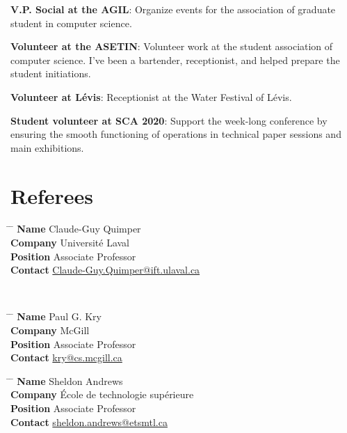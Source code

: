 \documentclass[10pt]{article} %
\begin{document}
\textbf{V.P. Social at the AGIL}: Organize events for the association of graduate student in computer science.

\textbf{Volunteer at the ASETIN}: Volunteer work at the student association of computer science. I've been a bartender, receptionist, and helped prepare the student initiations.

\textbf{Volunteer at Lévis}: Receptionist at the Water Festival of Lévis.

\textbf{Student volunteer at SCA 2020}: Support the week-­long conference by ensuring the smooth functioning of operations in technical paper sessions and main exhibitions.

\section{Referees}

\parbox{0.5\textwidth}{ 
\begin{tabbing}
\hspace{2.75cm} \= \hspace{4cm} \= \kill 
{\bf Name} \> Claude-Guy Quimper \\ 
{\bf Company} \> Université Laval \\ 
{\bf Position} \> Associate Professor \\  
{\bf Contact} \> \href{mailto:Claude-Guy.Quimper@ift.ulaval.ca}{Claude-Guy.Quimper@ift.ulaval.ca} 
\end{tabbing}}\\

\parbox{0.5\textwidth}{
\begin{tabbing}
\hspace{2.75cm} \= \hspace{4cm} \= \kill
{\bf Name} \> Paul G. Kry\\ 
{\bf Company} \> McGill\\ 
{\bf Position} \> Associate Professor \\ 
{\bf Contact} \> \href{mailto:kry@cs.mcgill.ca}{kry@cs.mcgill.ca}
\end{tabbing}}

\parbox{0.5\textwidth}{
\begin{tabbing}
\hspace{2.75cm} \= \hspace{4cm} \= \kill
{\bf Name} \> Sheldon Andrews\\ 
{\bf Company} \> École de technologie supérieure\\ 
{\bf Position} \> Associate Professor \\ 
{\bf Contact} \> \href{mailto:sheldon.andrews@etsmtl.ca}{sheldon.andrews@etsmtl.ca}
\end{tabbing}}
\end{document}
